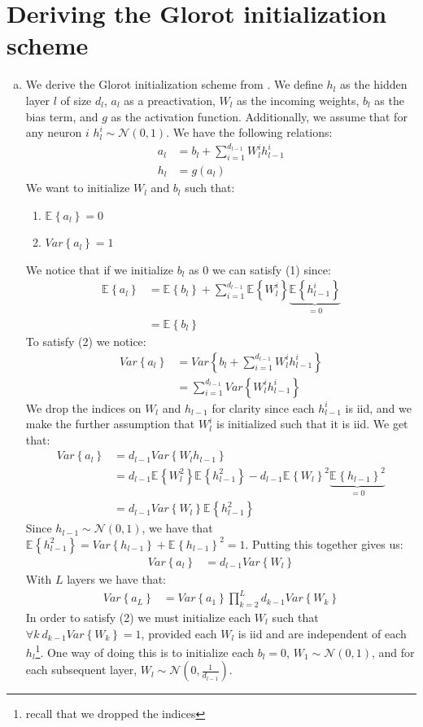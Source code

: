 \documentclass[paper=a4, fontsize=11pt]{scrartcl} %
\numberwithin{equation}{section} %
\numberwithin{figure}{section} %
\numberwithin{table}{section} %
\newcommand{\Ex}[2]{\mathbb{E}_{#1}\left\{#2\right\}}
\newcommand{\Var}[1]{Var\left\{#1\right\}}
\begin{document}
\section{Deriving the Glorot initialization scheme}
\begin{enumerate}[(a)]
	\item We derive the Glorot initialization scheme from \cite{pmlr-v9-glorot10a}. We define $h_l$ as the hidden layer $l$ of size $d_l$, $a_l$ as a preactivation, $W_l$ as the incoming weights, $b_l$ as the bias term, and $g$ as the activation function. Additionally, we assume that for any neuron $i$ $h^i_{l}\sim \mathcal{N}(0,1)$. We have the following relations:
	\begin{align*}
	a_l &= b_l + \sum_{i=1}^{d_{l-1}} W_l^ih_{l-1}^i \\
	h_{l} &= g(a_l)
	\end{align*}
	We want to initialize $W_l$ and $b_l$ such that:
	\begin{enumerate}[(1)]
		\item $\Ex{}{a_l}=0$
		\item $\Var{a_l}=1$
	\end{enumerate}
	We notice that if we initialize $b_l$ as $0$ we can satisfy (1) since:
	\begin{align*}
	\Ex{}{a_l} &= \Ex{}{b_l} + \sum_{i=1}^{d_{l-1}} \Ex{}{W_l^i}\underbrace{\Ex{}{h_{l-1}^i}}_{=0}\\
	&= \Ex{}{b_l}
	\end{align*}
	To satisfy (2) we notice:
	\begin{align*}
	\Var{a_l}&= \Var{b_l + \sum_{i=1}^{d_{l-1}} W_l^ih_{l-1}^i}\\
	&= \sum_{i=1}^{d_{l-1}} \Var{W_l^i h_{l-1}^i }
	\end{align*}
	We drop the indices on $W_l$ and $h_{l-1}$ for clarity since each $h_{l-1}^i$ is iid, and we make the further assumption that $W_{l}^i$ is initialized such that it is iid. We get that:
	\begin{align*}
	\Var{a_l} &= d_{l-1} \Var{W_lh_{l-1}}\\
	&=d_{l-1} \Ex{}{W_l^2}\Ex{}{h_{l-1}^2} - d_{l-1} \Ex{}{W_l}^2\underbrace{\Ex{}{h_{l-1}}^2}_{=0}\\
	&= d_{l-1} \Var{W_l}\Ex{}{h_{l-1}^2}
	\end{align*}
	Since $h_{l-1}\sim\mathcal{N}(0,1)$, we have that $\Ex{}{h_{l-1}^2} = \Var{h_{l-1}} + \Ex{}{h_{l-1}}^2 = 1$. Putting this together gives us:
	\begin{align*}
	\Var{a_l} &= d_{l-1} \Var{W_l}
	\end{align*}
	With $L$ layers we have that:
	\begin{align*}
	\Var{a_L} &= \Var{ a_1} \prod_{k=2}^{L} d_{k-1} \Var{W_k}
	\end{align*}
	In order to satisfy (2) we must initialize each $W_l$ such that $\forall k \ d_{k-1}\Var{W_k} = 1$, provided each $W_l$ is iid and are independent of each $h_l$\footnote{recall that we dropped the indices}. One way of doing this is to initialize each $b_l=0$, $W_1\sim\mathcal{N}(0,1)$, and for each subsequent layer, $W_l\sim\mathcal{N}\left(0,\frac{1}{d_{l-1}}\right)$.
	

\end{enumerate}
\end{document}
